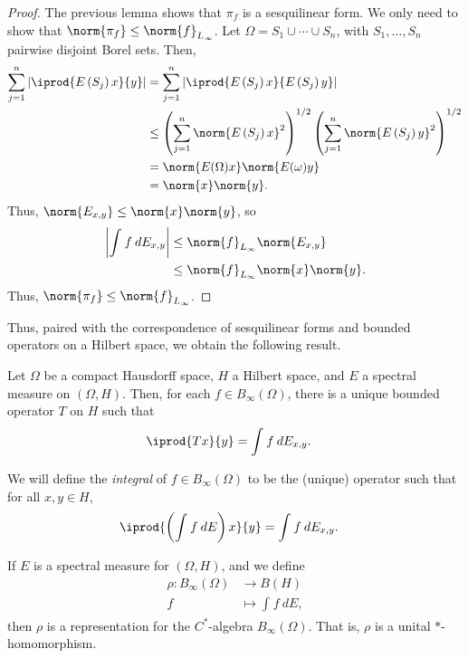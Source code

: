 \documentclass[10pt]{mypackage}
\begin{document}
\begin{proof}
  The previous lemma shows that $\pi_f$ is a sesquilinear form. We only need to show that $\norm{\pi_f}\leq \norm{f}_{L_{\infty}}$. Let $\Omega = S_1\cup\cdots\cup S_n$, with $S_1,\dots,S_n$ pairwise disjoint Borel sets. Then,
  \begin{align*}
    \sum_{j=1}^{n} \left\vert \iprod{E\left( S_j \right)x}{y} \right\vert &= \sum_{j=1}^{n}\left\vert \iprod{E\left( S_j \right)x}{E\left( S_j \right)y} \right\vert\\
                                                                          &\leq \left( \sum_{j=1}^{n}\norm{E\left( S_j \right)x}^2 \right)^{1/2}\left( \sum_{j=1}^{n} \norm{E\left( S_j \right)y}^2 \right)^{1/2}\\
                                                                          &= \norm{E(\Omega)x}\norm{E(\omega)y}\\
                                                                          &= \norm{x}\norm{y}.
  \end{align*}
  Thus, $\norm{E_{x,y}}\leq \norm{x}\norm{y}$, so
  \begin{align*}
    \left\vert \int_{}^{} f\:dE_{x,y} \right\vert &\leq \norm{f}_{L_{\infty}}\norm{E_{x,y}}\\
                                                  &\leq \norm{f}_{L_{\infty}}\norm{x}\norm{y}.
  \end{align*}
  Thus, $\norm{\pi_f}\leq \norm{f}_{L_{\infty}}$.
\end{proof}
Thus, paired with the correspondence of sesquilinear forms and bounded operators on a Hilbert space, we obtain the following result.
\begin{theorem}
  Let $\Omega$ be a compact Hausdorff space, $H$ a Hilbert space, and $E$ a spectral measure on $\left( \Omega,H \right)$. Then, for each $f\in B_{\infty}(\Omega)$, there is a unique bounded operator $T$ on $H$ such that
  \begin{align*}
    \iprod{Tx}{y} &= \int_{}^{} f\:dE_{x,y}.
  \end{align*}
\end{theorem}
We will define the \textit{integral} of $f\in B_{\infty}(\Omega)$ to be the (unique) operator such that for all $x,y\in H$,
\begin{align*}
  \iprod{ \left( \int_{}^{} f\:dE \right)x }{y} &= \int_{}^{} f\:dE_{x,y}.
\end{align*}
\begin{proposition}
  If $E$ is a spectral measure for $\left( \Omega,H \right)$, and we define
  \begin{align*}
    \rho\colon B_{\infty}(\Omega) &\rightarrow B(H)\\
    f &\mapsto \int_{}^{} f\:dE,
  \end{align*}
  then $\rho$ is a representation for the $C^{\ast}$-algebra $B_{\infty}(\Omega)$. That is, $\rho$ is a unital $\ast$-homomorphism.
\end{proposition}
\end{document}
